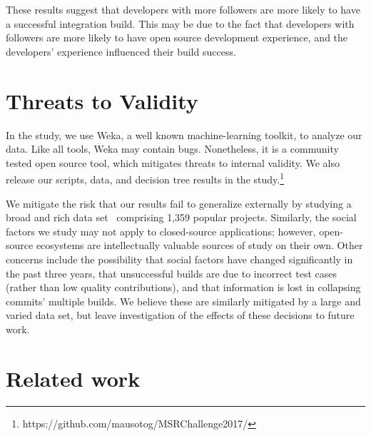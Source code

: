 \documentclass[10pt, conference]{IEEEtran}
\begin{document}
These results suggest that developers
with more followers are more likely to have a successful integration build.
This may be due to the fact that developers with followers are more likely to
have open source development experience, and the developers' experience
influenced their build success.

\section{Threats to Validity}
\label{sec-threats}

In the study, we use Weka, a well known machine-learning toolkit,
to analyze our data.
Like all tools, Weka may contain bugs. 
Nonetheless, it is a community tested open source tool, which mitigates threats to 
internal validity. We also release our scripts, data, and decision tree 
results in the study.\footnote{https://github.com/mausotog/MSRChallenge2017/}

We mitigate the risk that our results fail to 
generalize externally by studying a broad and rich 
data set~\cite{msr17challenge} comprising 1,359 popular projects.
Similarly, the social factors we study may not apply to closed-source
applications; however, open-source ecosystems are intellectually
valuable sources of study on their own. 
%
 Other concerns include the possibility that social factors
 have changed significantly in the past three years, that unsuccessful
 builds are due to
 incorrect test cases (rather than low quality contributions), and that
 information is lost in collapsing commits' multiple builds. We believe these
 are similarly mitigated by a large and varied data set, but leave investigation
 of the effects of these decisions to future work. 
 
\section{Related work}
\end{document}
